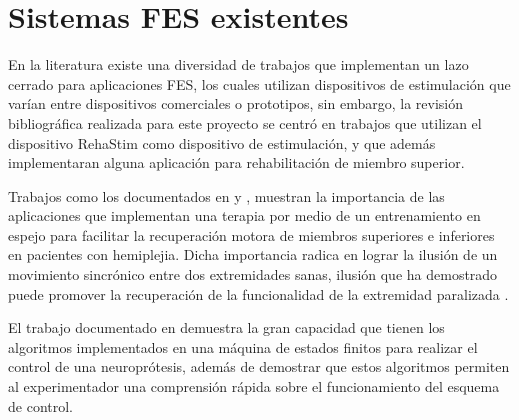 %

\section{Sistemas FES existentes}
En la literatura existe una diversidad de trabajos que implementan un lazo cerrado para aplicaciones FES, los cuales utilizan dispositivos de estimulación que varían entre dispositivos comerciales o prototipos, sin embargo, la revisión bibliográfica realizada para este proyecto se centró en trabajos que utilizan el dispositivo RehaStim como dispositivo de estimulación, y que además implementaran alguna aplicación para rehabilitación de miembro superior.

Trabajos como los documentados en \cite{Salchow2016} y \cite{Kim2015}, muestran la importancia de las aplicaciones que implementan una terapia por medio de un entrenamiento en espejo para facilitar la recuperación motora de miembros superiores e inferiores en pacientes con hemiplejia. Dicha importancia radica en lograr la ilusión de un movimiento sincrónico entre dos extremidades sanas, ilusión que ha demostrado puede promover la recuperación de la funcionalidad de la extremidad paralizada \cite{Deconinck2015}.

El trabajo documentado en \cite{Sun2014} demuestra la gran capacidad que tienen los algoritmos implementados en una máquina de estados finitos para realizar el control de una neuroprótesis, además de demostrar que estos algoritmos permiten al experimentador una comprensión rápida sobre el funcionamiento del esquema de control.

